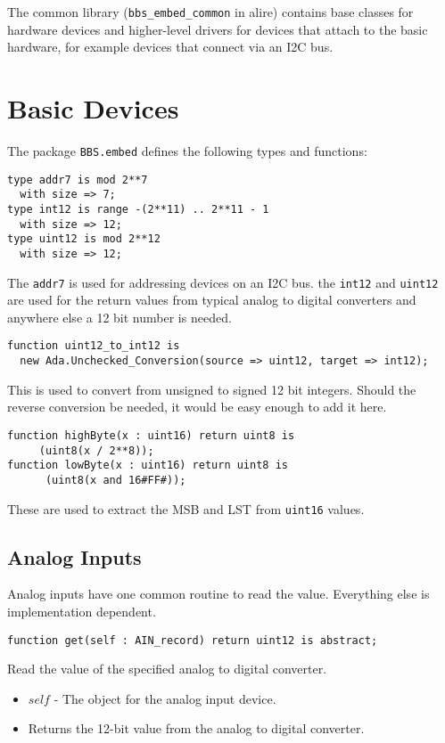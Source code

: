 \documentclass[10pt, openany]{book}
\newcommand{\package}[1]{\texttt{#1}}
\newcommand{\datatype}[1]{\texttt{#1}}
\begin{document}
The common library (\package{bbs\_embed\_common} in alire) contains base classes for hardware devices and higher-level drivers for devices that attach to the basic hardware, for example devices that connect via an I2C bus.

\section{Basic Devices}
The package \package{BBS.embed} defines the following types and functions:
\begin{lstlisting}
type addr7 is mod 2**7
  with size => 7;
type int12 is range -(2**11) .. 2**11 - 1
  with size => 12;
type uint12 is mod 2**12
  with size => 12;
\end{lstlisting}
The \datatype{addr7} is used for addressing devices on an I2C bus.  the \datatype{int12} and \datatype{uint12} are used for the return values from typical analog to digital converters and anywhere else a 12 bit number is needed.
\begin{lstlisting}
function uint12_to_int12 is
  new Ada.Unchecked_Conversion(source => uint12, target => int12);
\end{lstlisting}
This is used to convert from unsigned to signed 12 bit integers.  Should the reverse conversion be needed, it would be easy enough to add it here.
\begin{lstlisting}
function highByte(x : uint16) return uint8 is
     (uint8(x / 2**8));
function lowByte(x : uint16) return uint8 is
      (uint8(x and 16#FF#));
\end{lstlisting}
These are used to extract the MSB and LST from \datatype{uint16} values.

\subsection{Analog Inputs}
Analog inputs have one common routine to read the value.  Everything else is implementation dependent.
\begin{lstlisting}
function get(self : AIN_record) return uint12 is abstract;
\end{lstlisting}
Read the value of the specified analog to digital converter.
\begin{itemize}
  \item $self$ - The object for the analog input device.
  \item Returns the 12-bit value from the analog to digital converter.
\end{itemize}
\end{document}
